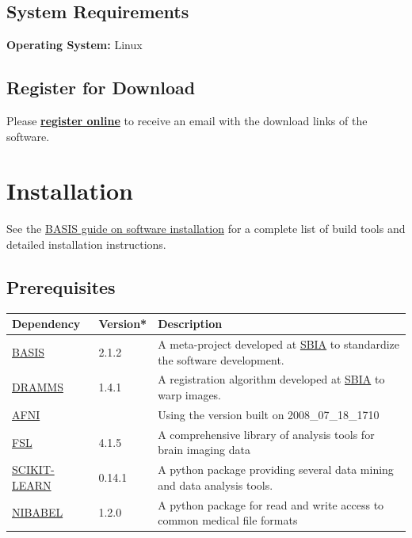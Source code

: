 \documentclass[letterpaper,10pt,english]{sphinxhowto}
\begin{document}
\subsection{System Requirements}
\label{download:system-requirements}
\textbf{Operating System:} Linux


\subsection{Register for Download}
\label{download:register-for-download}\label{download:register}
Please \href{http://www.cbica.upenn.edu/sbia/software/mass/download.html\#register}{\textbf{register online}} to receive an email with the download links of the software.
\pagebreak\pagebreak

\section{Installation}
\label{installation:installation}\label{installation:register-online}\label{installation::doc}
See the \href{http://www.cbica.upenn.edu/sbia/software/basis/howto/install.html}{BASIS guide on software installation} for a complete list of build tools and
detailed installation instructions.


\subsection{Prerequisites}
\label{installation:prerequisites}
\begin{tabulary}{\linewidth}{|p{3.75cm}|m{1.5cm}|p{10cm}|}
\hline
\textbf{
Dependency
} & \textbf{
Version*
} & \textbf{
Description
}\\\hline

\href{http://www.cbica.upenn.edu/sbia/software/basis/index.html}{BASIS}
 & 
2.1.2
 & 
A meta-project developed at \href{http://www.cbica.upenn.edu/sbia/index.html}{SBIA} to standardize the software development.
\\\hline

\href{http://www.cbica.upenn.edu/sbia/software/dramms/download.html}{DRAMMS}
 & 
1.4.1
 & 
A registration algorithm developed at \href{http://www.cbica.upenn.edu/sbia/index.html}{SBIA} to warp images.
\\\hline

\href{http://afni.nimh.nih.gov/afni/download}{AFNI}
 &  & 
Using the version built on 2008\_07\_18\_1710
\\\hline

\href{http://fsl.fmrib.ox.ac.uk/fsl/fslwiki/FslInstallation}{FSL}
 & 
4.1.5
 & 
A comprehensive library of analysis tools for brain imaging data
\\\hline

\href{http://scikit-learn.org/stable/install.html}{SCIKIT-LEARN}
 & 
0.14.1
 & 
A python package providing several data mining and data analysis tools.
\\\hline

\href{http://nipy.org/nibabel/installation.html}{NIBABEL}
 & 
1.2.0
 & 
A python package for read and write access to common medical file formats
\\\hline
\end{tabulary}
\end{document}
